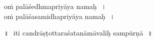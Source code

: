 \documentclass[parskip, DIV=14, pagenumber=head,top]{scrartcl}
\begin{document}
oṁ palāśedhmapriyāya namaḥ\,~।\\
oṁ palāśasamidhapriyāya namaḥ\,~।\\

\vspace{1cm}

॥~\,iti candrāṣṭottaraśatanāmāvaliḥ sampūrṇā\,~॥ \\

%
\end{document}

